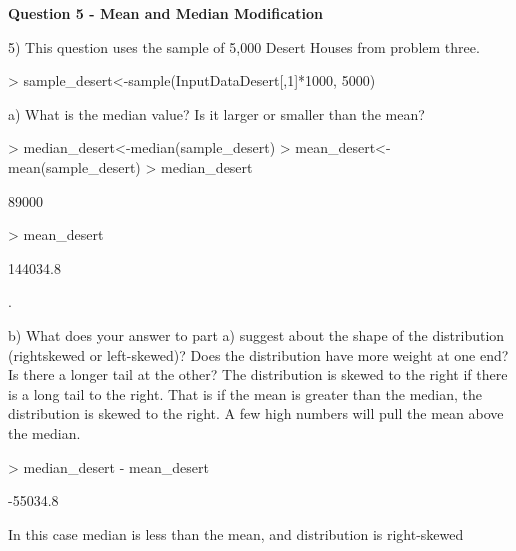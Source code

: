 \documentclass[12pt]{article}
\begin{document}
\newpage
\begin{center}
{\bf\Large Question 5 - Mean and Median Modification}
\linebreak
\end{center}
5) This question uses the sample of 5,000 Desert Houses from problem three.
\begin{Schunk}
\begin{Sinput}
> sample_desert<-sample(InputDataDesert[,1]*1000, 5000)
\end{Sinput}
\end{Schunk}
a) What is the median value? Is it larger or smaller than the mean?
\begin{Schunk}
\begin{Sinput}
> median_desert<-median(sample_desert)
> mean_desert<-mean(sample_desert)
> median_desert
\end{Sinput}
\begin{Soutput}
[1] 89000
\end{Soutput}
\begin{Sinput}
> mean_desert
\end{Sinput}
\begin{Soutput}
[1] 144034.8
\end{Soutput}
\end{Schunk}
.

b) What does your answer to part a) suggest about the shape of the distribution 
(rightskewed or left-skewed)? 
Does the distribution have more weight at one end? 
Is there a longer tail at the other? 
The distribution is skewed to the right if there is a long tail to the right. 
That is if the mean is greater than the median, 
the distribution is skewed to the right. 
A few high numbers will pull the mean above the median.

\begin{Schunk}
\begin{Sinput}
> median_desert - mean_desert
\end{Sinput}
\begin{Soutput}
[1] -55034.8
\end{Soutput}
\end{Schunk}
\tabularnewline
In this case median is less than the mean, and distribution is right-skewed

\tabularnewline
\end{document}
